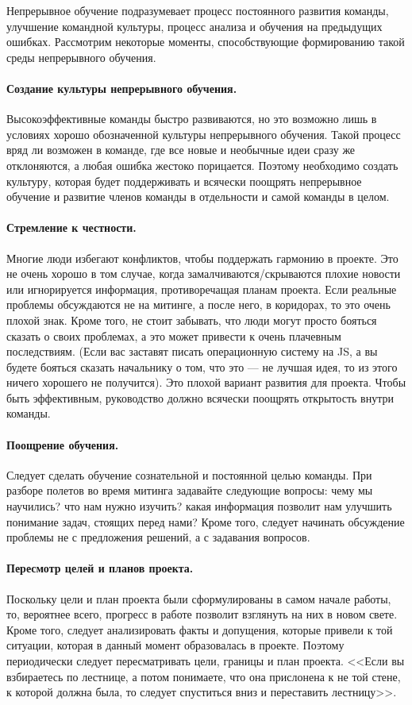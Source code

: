\documentclass{../../text-style}
\begin{document}
Непрерывное обучение подразумевает процесс постоянного развития команды, улучшение командной культуры, процесс анализа и обучения на предыдущих ошибках. Рассмотрим некоторые моменты, способствующие формированию такой среды непрерывного обучения.

\paragraph*{Создание культуры непрерывного обучения.} Высокоэффективные команды быстро развиваются, но это возможно лишь в условиях хорошо обозначенной культуры непрерывного обучения. Такой процесс вряд ли возможен в команде, где все новые и необычные идеи сразу же отклоняются, а любая ошибка жестоко порицается. Поэтому необходимо создать культуру, которая будет поддерживать и всячески поощрять непрерывное обучение и развитие членов команды в отдельности и самой команды в целом.

\paragraph*{Стремление к честности.} Многие люди избегают конфликтов, чтобы поддержать гармонию в проекте. Это не очень хорошо в том случае, когда замалчиваются/скрываются плохие новости или игнорируется информация, противоречащая планам проекта. Если реальные проблемы обсуждаются не на митинге, а после него, в коридорах, то это очень плохой знак. Кроме того, не стоит забывать, что люди могут просто бояться сказать о своих проблемах, а это может привести к очень плачевным последствиям. (Если вас заставят писать операционную систему на JS, а вы будете бояться сказать начальнику о том, что это --- не лучшая идея, то из этого ничего хорошего не получится). Это плохой вариант развития для проекта. Чтобы быть эффективным, руководство должно всячески поощрять открытость внутри команды.

\paragraph*{Поощрение обучения.} Следует сделать обучение сознательной и постоянной целью команды. При разборе полетов во время митинга задавайте следующие вопросы: чему мы научились? что нам нужно изучить? какая информация позволит нам улучшить понимание задач, стоящих перед нами? Кроме того, следует начинать обсуждение проблемы не с предложения решений, а с задавания вопросов.

\paragraph*{Пересмотр целей и планов проекта.} Поскольку цели и план проекта были сформулированы в самом начале работы, то, вероятнее всего, прогресс в работе позволит взглянуть на них в новом свете. Кроме того, следует анализировать факты и допущения, которые привели к той ситуации, которая в данный момент образовалась в проекте. Поэтому периодически следует пересматривать цели, границы и план проекта. <<Если вы взбираетесь по лестнице, а потом понимаете, что она прислонена к не той стене, к которой должна была, то следует спуститься вниз и переставить лестницу>>.
\end{document}
